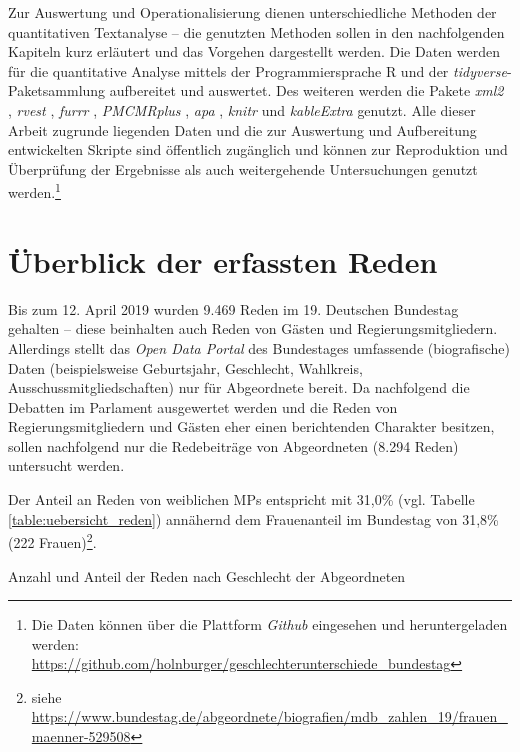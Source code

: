 \documentclass[12pt, 
    twoside=false, 
    bibliography=totoc, 
    numbers=endperiod, 
    headings=normal, 
    toc=chapterentrydotfill
    ]{scrbook}
\begin{document}
Zur Auswertung und Operationalisierung dienen unterschiedliche Methoden der quantitativen Textanalyse -- die genutzten Methoden sollen in den nachfolgenden Kapiteln kurz erläutert und das Vorgehen dargestellt werden. Die Daten werden für die quantitative Analyse mittels der Programmiersprache R \parencite{rcoreteam_2018} und der \emph{tidyverse}-Paketsammlung \parencite{wickham_2017} aufbereitet und auswertet. Des weiteren werden die Pakete \emph{xml2} \parencite{wickham_2018}, \emph{rvest} \parencite{wickham_2016}, \emph{furrr} \parencite{vaughan_2018}, \emph{PMCMRplus} \parencite{pohlert_2018}, \emph{apa} \parencite{gromer_2019}, \emph{knitr} \parencite{xie_2014} und \emph{kableExtra} \parencite{zhu_2019} genutzt. 
Alle dieser Arbeit zugrunde liegenden Daten und die zur Auswertung und Aufbereitung entwickelten Skripte sind öffentlich zugänglich und können zur Reproduktion und Überprüfung der Ergebnisse als auch weitergehende Untersuchungen genutzt werden.\footnote{Die Daten können über die Plattform \emph{Github} eingesehen und heruntergeladen werden: \url{https://github.com/holnburger/geschlechterunterschiede_bundestag}}

\section{Überblick der erfassten Reden}\label{kapitel:ueberblick_reden}

Bis zum 12. April 2019 wurden 9.469 Reden im 19. Deutschen Bundestag gehalten -- diese beinhalten auch Reden von Gästen und Regierungsmitgliedern. Allerdings stellt das \emph{Open Data Portal} des Bundestages umfassende (biografische) Daten (beispielsweise Geburtsjahr, Geschlecht, Wahlkreis, Ausschussmitgliedschaften) nur für Abgeordnete bereit. Da nachfolgend die Debatten im Parlament ausgewertet werden und die Reden von Regierungsmitgliedern und Gästen eher einen berichtenden Charakter besitzen, sollen nachfolgend nur die Redebeiträge von Abgeordneten (8.294 Reden) untersucht werden.

Der Anteil an Reden von weiblichen MPs entspricht mit 31,0\% (vgl. Tabelle \ref{table:uebersicht_reden}) annähernd dem Frauenanteil im Bundestag von 31,8\% (222 Frauen)\footnote{siehe \url{https://www.bundestag.de/abgeordnete/biografien/mdb_zahlen_19/frauen_maenner-529508}}.


\begin{table}[htb]
    \centering
    \caption{Anzahl und Anteil der Reden nach Geschlecht der Abgeordneten}
    
    \label{table:uebersicht_reden}
\end{table}
\end{document}
